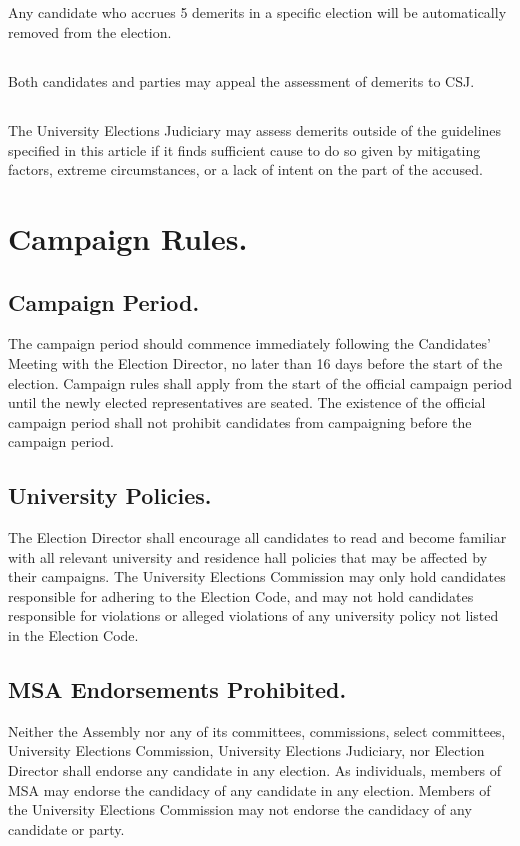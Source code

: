 \subsection{}
Any candidate who accrues 5 demerits in a specific election will be automatically removed from the election.
\subsection{}
Both candidates and parties may appeal the assessment of demerits to CSJ.
\subsection{}
The University Elections Judiciary may assess demerits outside of the guidelines specified in this article if it finds sufficient cause to do so given by mitigating factors, extreme circumstances, or a lack of intent on the part of the accused.


\section{Campaign Rules.}

\subsection{Campaign Period.}
The campaign period should commence immediately following the Candidates' Meeting with the Election Director, no later than 16 days before the start of the election. Campaign rules shall apply from the start of the official campaign period until the newly elected representatives are seated.  The existence of the official campaign period shall not prohibit candidates from campaigning before the campaign period.

\subsection{University Policies.}
The Election Director shall encourage all candidates to read and become familiar with all relevant university and residence hall policies that may be affected by their campaigns.  The University Elections Commission may only hold candidates responsible for adhering to the Election Code, and may not hold candidates responsible for violations or alleged violations of any university policy not listed in the Election Code.

\subsection{MSA Endorsements Prohibited.}
Neither the Assembly nor any of its committees, commissions, select committees, University Elections Commission, University Elections Judiciary, nor Election Director shall endorse any candidate in any election.  As individuals, members of MSA may endorse the candidacy of any candidate in any election.  Members of the University Elections Commission may not endorse the candidacy of any candidate or party.

